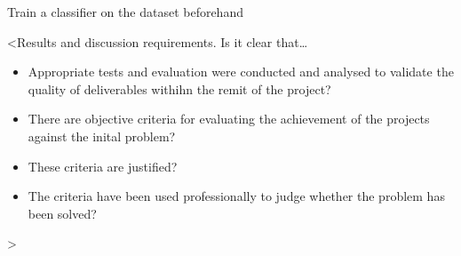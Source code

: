 Train a classifier on the dataset beforehand

<Results and discussion requirements. Is it clear that\dots
\begin{itemize}
    \item Appropriate tests and evaluation were conducted and analysed to validate the quality of deliverables withihn the remit of the project?
    \item There are objective criteria for evaluating the achievement of the projects against the inital problem?
    \item These criteria are justified?
    \item The criteria have been used professionally to judge whether the problem has been solved?
\end{itemize}
>